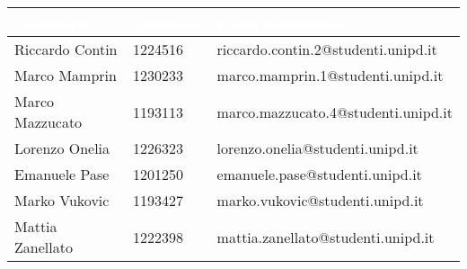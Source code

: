 \begin{center}
  \centering
  \begin{longtable}{|C{3,3cm}|C{1,8cm}|C{7cm}|}
    \hline
    \textcolor[HTML]{FFFFFF}{\textbf{Nominativo}} & \textcolor[HTML]{FFFFFF}{\textbf{Matricola}} & \textcolor[HTML]{FFFFFF}{\textbf{Posta Elettronica}} \\ \hline
    Riccardo Contin & 1224516 & riccardo.contin.2@studenti.unipd.it \\ \hline
    Marco Mamprin & 1230233 & marco.mamprin.1@studenti.unipd.it \\ \hline
    Marco Mazzucato & 1193113 & marco.mazzucato.4@studenti.unipd.it \\ \hline
    Lorenzo Onelia & 1226323 & lorenzo.onelia@studenti.unipd.it \\ \hline
    Emanuele Pase & 1201250 & emanuele.pase@studenti.unipd.it \\ \hline
    Marko Vukovic & 1193427 & marko.vukovic@studenti.unipd.it \\ \hline
    Mattia Zanellato & 1222398 & mattia.zanellato@studenti.unipd.it \\ \hline
  \end{longtable}
\end{center}
